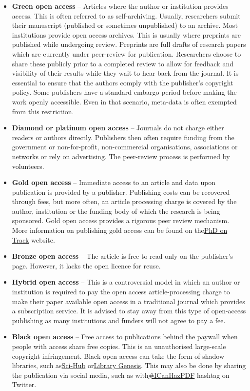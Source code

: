 \documentclass[
]{book}
\begin{document}
\begin{itemize}
\item
  \textbf{Green open access} -- Articles where the author or institution provides access. This is often referred to as self-archiving. Usually, researchers submit their manuscript (published or sometimes unpublished) to an archive. Most institutions provide open access archives. This is usually where preprints are published while undergoing review. Preprints are full drafts of research papers which are currently under peer-review for publication. Researchers choose to share these publicly prior to a completed review to allow for feedback and visibility of their results while they wait to hear back from the journal. It is essential to ensure that the authors comply with the publisher's copyright policy. Some publishers have a standard embargo period before making the work openly accessible. Even in that scenario, meta-data is often exempted from this restriction.
\item
  \textbf{Diamond or platinum open access} -- Journals do not charge either readers or authors directly. Publishers then often require funding from the government or non-for-profit, non-commercial organisations, associations or networks or rely on advertising. The peer-review process is performed by volunteers.
\item
  \textbf{Gold open access} -- Immediate access to an article and data upon publication is provided by a publisher. Publishing costs can be recovered through fees, but more often, an article processing charge is covered by the author, institution or the funding body of which the research is being sponsored. Gold open access provides a rigorous peer review mechanism. More information on publishing gold access can be found on the\href{https://www.phdontrack.net/open-science/open-access-publishing/\#toc3}{PhD on Track} website.
\item
  \textbf{Bronze open access} -- The article is free to read only on the publisher's page. However, it lacks the open licence for reuse.
\item
  \textbf{Hybrid open access} -- This is a controversial model in which an author or institution is required to pay the open access article-processing charge to make their paper available open access in a traditional journal which provides a subscription service. It is advised to stay away from this type of open-access publishing as many institutions and funders will not agree to pay a fee.
\item
  \textbf{Black open access} -- Free access to publications behind the paywall when people with access share free copies. This is an unauthorised large-scale copyright infringement. Black open access can take the form of shadow libraries, such as\href{https://en.wikipedia.org/wiki/Sci-Hub}{Sci-Hub} or\href{https://en.wikipedia.org/wiki/Library_Genesis}{Library Genesis}. This may also be done by sharing the publication via social media, such as with\href{https://en.wikipedia.org/wiki/ICanHazPDF}{\#ICanHazPDF} hashtag on Twitter.
\end{itemize}
\end{document}
